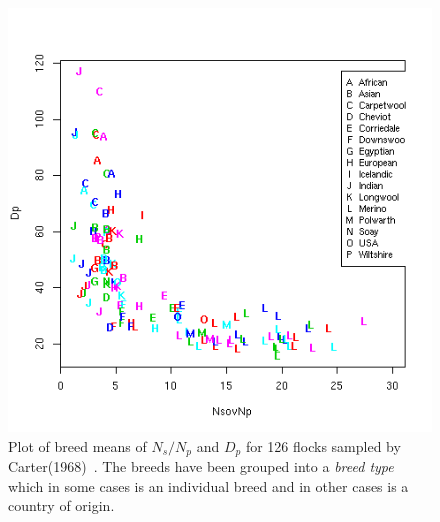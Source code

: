 %

\begin{figure}[!h]
  \centering
   \includegraphics[width=1.0\textwidth]{NsovNpDp.png}
  \caption{Plot of breed means of $N_{s}/N_{p}$ and $D_{p}$ for 126 flocks sampled by Carter(1968)~\cite{cart:68}. The breeds have been grouped into a {\em breed type} which in some cases is an individual breed and in other cases is a country of origin. }
  \label{fig:NsovNpDp}
\end{figure}

%

